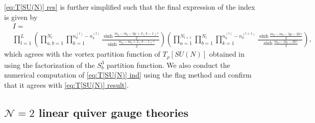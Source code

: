 \documentclass[a4paper,11pt]{article}
\begin{document}
\eqref{eq:T[SU(N)] res} is further simplified such that the final expression of the index is given by
\begin{align}
\label{eq:T[SU(N)] result}
%
& I = \nonumber \\
& \prod_{l = 1}^{L} \left(\prod_{a,b = 1}^{N_l} \prod_{k = 1}^{n^{(l)}_a-n^{(l)}_b} \frac{\sinh \frac{m_a-m_b-2 \mu+2 (k-1) \gamma}{2}}{\sinh \frac{m_a-m_b+2 (k-1) \gamma}{2}}\right) \left(\prod_{a = 1}^{N_{l+1}} \prod_{b = 1}^{N_l} \prod_{k = 1}^{n^{(l)}_b-n^{(l+1)}_a} \frac{\sinh \frac{m_a-m_b-2 \mu-2 k \gamma}{2}}{\sinh \frac{m_a-m_b-2 k \gamma}{2}} \right),
%
\end{align}
which agrees with the vortex partition function of $T_\rho [SU(N)]$ obtained in \cite{Bullimore:2014awa} using the factorization of the $S^3_b$ partition function. We also conduct the numerical computation of \eqref{eq:T[SU(N)] ind} using the flag method and confirm that it agrees with \eqref{eq:T[SU(N)] result}.
\\



\subsection{$\mathcal N = 2$ linear quiver gauge theories}
\label{sec:N=2}
\end{document}
